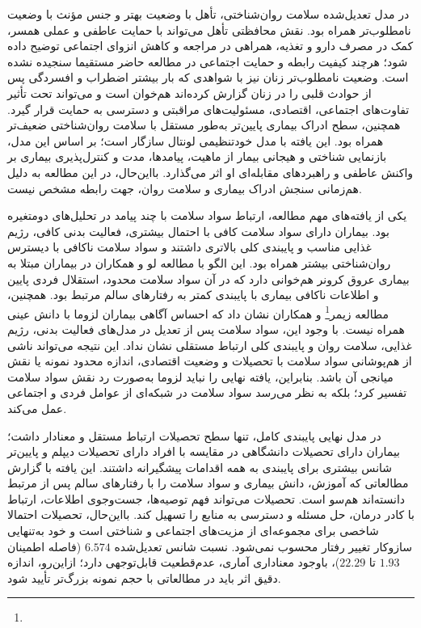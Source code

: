 در مدل تعدیل‌شده سلامت روان‌شناختی، تأهل با وضعیت بهتر و جنس مؤنث با وضعیت نامطلوب‌تر همراه بود. نقش محافظتی تأهل می‌تواند با حمایت عاطفی و عملی همسر، کمک در مصرف دارو و تغذیه، همراهی در مراجعه و کاهش انزوای اجتماعی توضیح داده شود؛ هرچند کیفیت رابطه و حمایت اجتماعی در مطالعه حاضر مستقیما سنجیده نشده است. وضعیت نامطلوب‌تر زنان نیز با شواهدی که بار بیشتر اضطراب و افسردگی پس از حوادث قلبی را در زنان گزارش کرده‌اند هم‌خوان است و می‌تواند تحت تأثیر تفاوت‌های اجتماعی، اقتصادی، مسئولیت‌های مراقبتی و دسترسی به حمایت قرار گیرد\cite{Flagtvedt2025Gender,Sullivan2022GenderDisparities,Serpytis2018Gender}. همچنین، سطح ادراک بیماری پایین‌تر به‌طور مستقل با سلامت روان‌شناختی ضعیف‌تر همراه بود. این یافته با مدل خودتنظیمی لونتال سازگار است؛ بر اساس این مدل، بازنمایی شناختی و هیجانی بیمار از ماهیت، پیامدها، مدت و کنترل‌پذیری بیماری بر واکنش عاطفی و راهبردهای مقابله‌ای او اثر می‌گذارد. بااین‌حال، در این مطالعه به دلیل هم‌زمانی سنجش ادراک بیماری و سلامت روان، جهت رابطه مشخص نیست.



یکی از یافته‌های مهم مطالعه، ارتباط سواد سلامت با چند پیامد در تحلیل‌های دومتغیره بود. بیماران دارای سواد سلامت کافی با احتمال بیشتری، فعالیت بدنی کافی، رژیم غذایی مناسب و پایبندی کلی بالاتری داشتند و سواد سلامت ناکافی با دیسترس روان‌شناختی بیشتر همراه بود. این الگو با مطالعه لو و همکاران در بیماران مبتلا به بیماری عروق کرونر هم‌خوانی دارد که در آن سواد سلامت محدود، استقلال فردی پایین و اطلاعات ناکافی بیماری با پایبندی کمتر به رفتارهای سالم مرتبط بود\cite{Lu2020HealthLiteracy}. همچنین، مطالعه زیمر\footnote{} و همکاران نشان داد که احساس آگاهی بیماران لزوما با دانش عینی همراه نیست\cite{Zeymer2024PatientKnowledge}. با وجود این، سواد سلامت پس از تعدیل در مدل‌های فعالیت بدنی، رژیم غذایی، سلامت روان و پایبندی کلی ارتباط مستقلی نشان نداد. این نتیجه می‌تواند ناشی از هم‌پوشانی سواد سلامت با تحصیلات و وضعیت اقتصادی، اندازه محدود نمونه یا نقش میانجی آن باشد. بنابراین، یافته نهایی را نباید لزوما به‌صورت رد نقش سواد سلامت تفسیر کرد؛ بلکه به نظر می‌رسد سواد سلامت در شبکه‌ای از عوامل فردی و اجتماعی عمل می‌کند.

در مدل نهایی پایبندی کامل، تنها سطح تحصیلات ارتباط مستقل و معنادار داشت؛ بیماران دارای تحصیلات دانشگاهی در مقایسه با افراد دارای تحصیلات دیپلم و پایین‌تر شانس بیشتری برای پایبندی به همه اقدامات پیشگیرانه داشتند. این یافته با گزارش مطالعاتی که آموزش، دانش بیماری و سواد سلامت را با رفتارهای سالم پس از  مرتبط دانسته‌اند هم‌سو است\cite{Lu2020HealthLiteracy,Jaim2025APCU}. تحصیلات می‌تواند فهم توصیه‌ها، جست‌وجوی اطلاعات، ارتباط با کادر درمان، حل مسئله و دسترسی به منابع را تسهیل کند. بااین‌حال، تحصیلات احتمالا شاخصی برای مجموعه‌ای از مزیت‌های اجتماعی و شناختی است و خود به‌تنهایی سازوکار تغییر رفتار محسوب نمی‌شود. نسبت شانس تعدیل‌شده $6.574$ (فاصله اطمینان $1.93$ تا $22.29$)، باوجود معناداری آماری، عدم‌قطعیت قابل‌توجهی دارد؛ ازاین‌رو، اندازه دقیق اثر باید در مطالعاتی با حجم نمونه‌ بزرگ‌تر تأیید شود.

